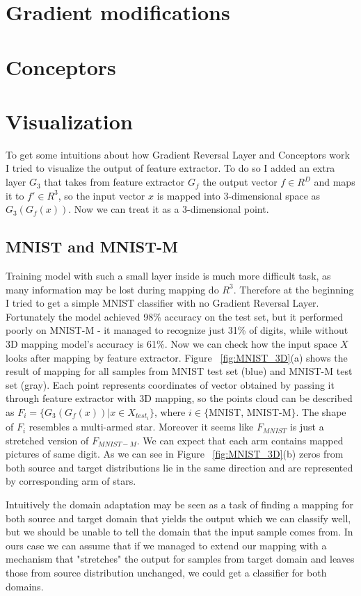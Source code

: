 \documentclass{article}
\begin{document}
\section{Gradient modifications}


\section{Conceptors}

\section{Visualization}
\par
To get some intuitions about how Gradient Reversal Layer and Conceptors work I tried to visualize the output of feature extractor. To do so I added an extra layer $G_{3}$ that takes from feature extractor $G_{f}$ the output vector ${ f } \in { R } ^ { D }$ and maps it to ${f'} \in {R}^{3}$, so the input vector ${x}$ is mapped into 3-dimensional space as $G_{3}(G_{f}(x))$. Now we can treat it as a 3-dimensional point. 

\subsection{MNIST and MNIST-M}
\par
Training model with such a small layer inside is much more difficult task, as many information may be lost during mapping do ${R}^{3}$. Therefore at the beginning I tried to get a simple MNIST classifier with no Gradient Reversal Layer. Fortunately the model achieved 98\% accuracy on the test set, but it performed poorly on MNIST-M - it managed to recognize just 31\% of digits, while without 3D mapping model's accuracy is 61\%. Now we can check how the input space ${X}$ looks after mapping by feature extractor. Figure ~\ref{fig:MNIST_3D}(a) shows the result of mapping for all samples from MNIST test set (blue) and MNIST-M test set (gray). Each point represents coordinates of vector obtained by passing it through feature extractor with 3D mapping, so the points cloud can be described as $F_{i} = \{G_{3}(G_{f}(x)) | x \in X_{test_{i}}\}$, where $i \in \{$MNIST, MNIST-M$\}$. The shape of ${F_{i}}$ resembles a multi-armed star. Moreover it seems like $F_{MNIST}$ is just a stretched version of $F_{MNIST-M}$. We can expect that each arm contains mapped pictures of same digit. As we can see in Figure ~\ref{fig:MNIST_3D}(b) zeros from both source and target distributions lie in the same direction and are represented by corresponding arm of stars. \par
Intuitively the domain adaptation may be seen as a task of finding a mapping for both source and target domain that yields the output which we can classify well, but we should be unable to tell the domain that the input sample comes from. In ours case we can assume that if we managed to extend our mapping with a mechanism that "stretches" the output for samples from target domain and leaves those from source distribution unchanged, we could get a classifier for both domains.
\end{document}
